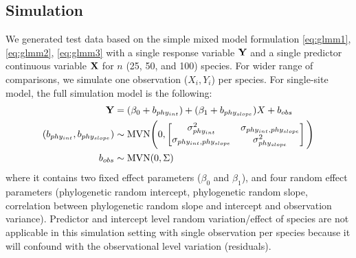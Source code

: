 \subsection{Simulation}

We generated test data based on the simple mixed model formulation \ref{eq:glmm1}, \ref{eq:glmm2}, \ref{eq:glmm3} with a single response variable ${\mathbf Y}$ and a single predictor continuous variable ${\mathbf X}$ for $n$ (25, 50, and 100) species.
For wider range of comparisons, we simulate one observation ($X_i,Y_i$) per species.
For single-site model, the full simulation model is the following:
\begin{align}
{\mathbf Y} & = (\beta_0 + b_{phy_{int}}) + (\beta_1 + b_{phy_{slope}}) X + b_{obs}\\
(b_{phy_{int}}, b_{phy_{slope}}) & \sim \textrm{MVN} \Bigg( 0, \begin{bmatrix}
\sigma^2_{phy_{int}} & \sigma_{phy_{int},phy_{slope}} \\ 
\sigma_{phy_{int},phy_{slope}} & \sigma^2_{phy_{slope}}
\end{bmatrix}
\Bigg) \\
b_{obs} & \sim \textrm{MVN} ( 0 , \Sigma)
\end{align}
where it contains two fixed effect parameters ($\beta_0$ and $\beta_1$), and four random effect parameters (phylogenetic random intercept, phylogenetic random slope, correlation between phylogenetic random slope and intercept and observation variance).  
Predictor and intercept level random variation/effect of species are not applicable in this simulation setting with single observation per species because it will confound with the observational level variation (residuals).

